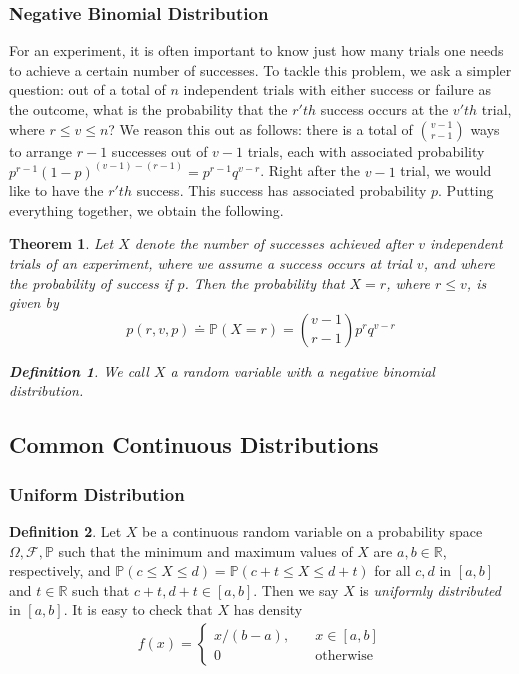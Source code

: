 \documentclass[12pt]{article}
\newcommand{\rr}{\mathbb{R}}
\newcommand{\filter}{\mathcal{F}}
\newcommand{\prob}{\mathbb{P}}
\theoremstyle{plain}
\newtheorem{theorem}{Theorem}
\theoremstyle{definition}
\newtheorem*{definition}{Definition}
\theoremstyle{remark}
\numberwithin{equation}{section}  %
\begin{document}
\subsubsection{Negative Binomial Distribution}
For an experiment, it is often important to know just how many trials
one needs to achieve a certain number of successes. To tackle this problem,
we ask a simpler question: out of a total of $n$ independent trials with
either success or failure as the outcome, what is the probability
that the $r'th$ success occurs at the $v'th$ trial, where $r \le v \le n$?
We reason this out as follows: there is a total of $\binom{v-1}{r-1}$ ways to
arrange $r-1$ successes out of $v-1$ trials, each with associated probability
$p^{r-1}{(1 - p)}^{(v-1) - (r-1)} = p^{r-1}q^{v-r}$. Right after the $v-1$ 
trial, we would like to
have the $r'th$ success. This success has associated probability $p$. Putting
everything together, we obtain the following.
\begin{theorem}
	Let $X$ denote the number of successes achieved after $v$ independent 
	trials of an experiment,
	where we assume a success occurs at trial $v$, and where the probability
	of success if $p$. Then the probability that $X=r$, where $r \le v$, is 
	given by
	\begin{equation*}
		p(r, v, p) \doteq \mathbb{P}(X = r) = \binom{v-1}{r-1} p^{r} q^{v-r}
	\end{equation*}
	\begin{definition}
		We call $X$ a random variable with a \emph{negative binomial 
		distribution}.
	\end{definition}
\end{theorem}
\subsection{Common Continuous Distributions}
\subsubsection{Uniform Distribution}
\begin{definition}
	Let $X$ be a continuous random variable on a probability space $\Omega, 
	\filter,
	\prob$ such that the minimum and maximum values of $X$ are $a,b \in \rr$,
	respectively, and $\prob(c \le X \le d ) = \prob(c + t \le X \le d + t)$
	for all $c, d$ in $[a,b]$  and $t \in \rr$ such that $c+t, d+t \in [a,b]$.
	Then we say $X$ is \emph{uniformly distributed} in $[a,b]$. It is easy to 
	check
	that $X$ has density  
	\begin{align*}
		f(x) = \begin{cases}
			x/(b-a), \quad & x \in [a,b] \\
			0 \quad &\text{otherwise}
		\end{cases}
	\end{align*}
\end{definition}
\end{document}
